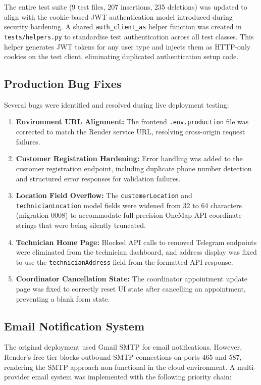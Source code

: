 \documentclass[conference]{IEEEtran}
\begin{document}
The entire test suite (9 test files, 207 insertions, 235 deletions) was updated to align with the cookie-based JWT authentication model introduced during security hardening. A shared \texttt{auth\_client\_as} helper function was created in \texttt{tests/helpers.py} to standardise test authentication across all test classes. This helper generates JWT tokens for any user type and injects them as HTTP-only cookies on the test client, eliminating duplicated authentication setup code.

\subsection{Production Bug Fixes}

Several bugs were identified and resolved during live deployment testing:

\begin{enumerate}
    \item \textbf{Environment URL Alignment:} The frontend \texttt{.env.production} file was corrected to match the Render service URL, resolving cross-origin request failures.
    \item \textbf{Customer Registration Hardening:} Error handling was added to the customer registration endpoint, including duplicate phone number detection and structured error responses for validation failures.
    \item \textbf{Location Field Overflow:} The \texttt{customerLocation} and \texttt{technicianLocation} model fields were widened from 32 to 64 characters (migration 0008) to accommodate full-precision OneMap API coordinate strings that were being silently truncated.
    \item \textbf{Technician Home Page:} Blocked API calls to removed Telegram endpoints were eliminated from the technician dashboard, and address display was fixed to use the \texttt{technicianAddress} field from the formatted API response.
    \item \textbf{Coordinator Cancellation State:} The coordinator appointment update page was fixed to correctly reset UI state after cancelling an appointment, preventing a blank form state.
\end{enumerate}

\subsection{Email Notification System}
\label{sec:email-system}

The original deployment used Gmail SMTP for email notifications. However, Render's free tier blocks outbound SMTP connections on ports 465 and 587, rendering the SMTP approach non-functional in the cloud environment. A multi-provider email system was implemented with the following priority chain:
\end{document}
